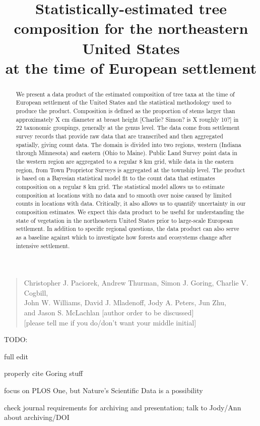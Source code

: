 \documentclass[12pt]{article}\usepackage[]{graphicx}\usepackage[]{color}
\begin{document}
\title{Statistically-estimated tree composition for the northeastern United
States \\
at the time of European settlement}
\maketitle
\begin{quote}
Christopher J. Paciorek, Andrew Thurman, Simon J. Goring, Charlie
V. Cogbill, \\
John W. Williams, David J. Mladenoff, Jody A. Peters, Jun Zhu, \\
and Jason S. McLachlan {[}author order to be discussed{]}\\
{[}please tell me if you do/don't want your middle initial{]}
\end{quote}
TODO:

full edit

properly cite Goring stuff 

focus on PLOS One, but Nature's Scientific Data is a possibility

check journal requirements for archiving and presentation; talk to
Jody/Ann about archiving/DOI



\begin{abstract}
We present a data product of the estimated composition of tree taxa
at the time of European settlement of the United States and the statistical
methodology used to produce the product. Composition is defined as
the proportion of stems larger than approximately X cm diameter at
breast height {[}Charlie? Simon? is X roughly 10?{]} in 22 taxonomic
groupings, generally at the genus level. The data come from settlement
survey records that provide raw data that are transcribed and then
aggregated spatially, giving count data. The domain is divided into
two regions, western (Indiana through Minnesota) and eastern (Ohio
to Maine). Public Land Survey point data in the western region are
aggregated to a regular 8 km grid, while data in the eastern region,
from Town Proprietor Surveys is aggregated at the township level.
The product is based on a Bayesian statistical model fit to the count
data that estimates composition on a regular 8 km grid. The statistical
model allows us to estimate composition at locations with no data
and to smooth over noise caused by limited counts in locations with
data. Critically, it also allows us to quantify uncertainty in our
composition estimates. We expect this data product to be useful for
understanding the state of vegetation in the northeastern United States
prior to large-scale European settlement. In addition to specific
regional questions, the data product can also serve as a baseline
against which to investigate how forests and ecosystems change after
intensive settlement.
\end{abstract}
\end{document}
